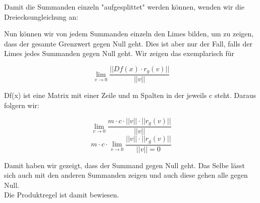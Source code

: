 \documentclass{article}
\begin{document}
\begin{multicols}{2}
Damit die Summanden einzeln "aufgesplittet" werden können, wenden wir die Dreiecksungleichung %
an:

Nun können wir von jedem Summanden einzeln den Limes bilden, um zu zeigen, dass der gesamte Grenzwert gegen Null geht. Dies ist aber nur der Fall, falls der Limes jedes Summanden gegen Null geht. Wir zeigen das exemplarisch für 

\begin{equation} \lim\limits_{v \rightarrow 0} \frac{||Df(x) \cdot r_{g}(v)||}{||v||} \end{equation}

Df(x) ist eine Matrix mit einer Zeile und m Spalten in der jeweils c steht. Daraus folgern wir:

\begin{equation} \lim\limits_{v \rightarrow 0} \frac{m \cdot c \cdot ||v|| \cdot ||r_{g}(v)||}{||v||} \end{equation}
\begin{equation}m \cdot c \cdot \lim\limits_{v \rightarrow 0} \frac{ ||v|| \cdot ||r_{g}(v)||}{||v|| = 0} \end{equation} 

Damit haben wir gezeigt, dass der Summand gegen Null geht. Das Selbe lässt sich auch mit den anderen Summanden zeigen und auch diese gehen alle gegen Null. \\
Die Produktregel ist damit bewiesen.





\end{multicols}
\end{document}
